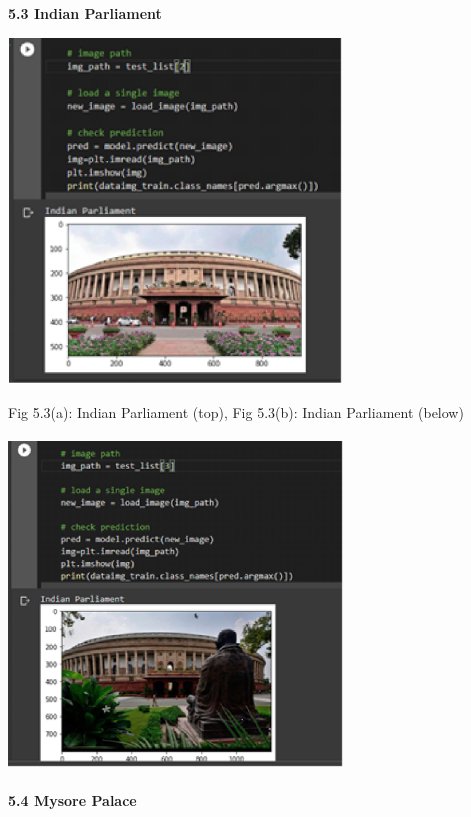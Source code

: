 \documentclass[10pt]{article} %
\begin{document}
\noindent \textbf{}
\newpage
\noindent \textbf{5.3 Indian Parliament}

\noindent 

\noindent 

\noindent \includegraphics*[width=3.49in, height=3.61in, keepaspectratio=false]{image10}

\noindent Fig 5.3(a): Indian Parliament (top), Fig 5.3(b): Indian Parliament (below)

\noindent \includegraphics*[width=3.49in, height=3.5in, keepaspectratio=false]{image11}

\noindent 

\noindent 

\noindent \textbf{5.4 Mysore Palace}

\newline
\end{document}
